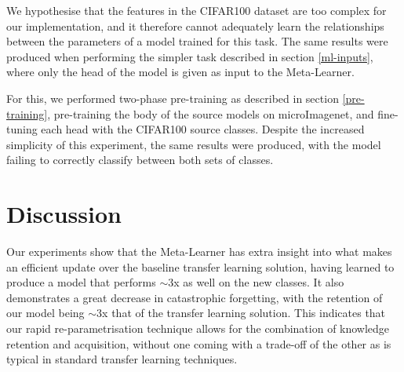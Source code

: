 \documentclass{report}
\begin{document}
We hypothesise that the features in the CIFAR100 dataset are too complex for our implementation, and it therefore cannot adequately learn the relationships between the parameters of a model trained for this task. The same results were produced when performing the simpler task described in section \ref{ml-inputs}, where only the head of the model is given as input to the Meta-Learner. \par
For this, we performed two-phase pre-training as described in section \ref{pre-training}, pre-training the body of the source models on microImagenet, and fine-tuning each head with the CIFAR100 source classes. Despite the increased simplicity of this experiment, the same results were produced, with the model failing to correctly classify between both sets of classes. \par


\section{Discussion}
Our experiments show that the Meta-Learner has extra insight into what makes an efficient update over the baseline transfer learning solution, having learned to produce a model that performs $\sim$3x as well on the new classes. It also demonstrates a great decrease in catastrophic forgetting, with the retention of our model being $\sim$3x that of the transfer learning solution. This indicates that our rapid re-parametrisation technique allows for the combination of knowledge retention and acquisition, without one coming with a trade-off of the other as is typical in standard transfer learning techniques.
\end{document}
